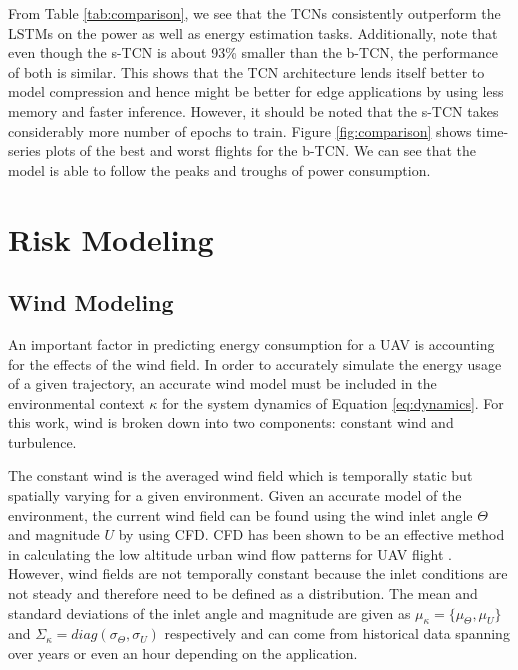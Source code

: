 \documentclass[letterpaper, 10 pt, conference]{ieeeconf}
\begin{document}
From Table \ref{tab:comparison}, we see that the TCNs consistently outperform the LSTMs on the power as well as energy estimation tasks. Additionally, note that even though the s-TCN is about 93\% smaller than the b-TCN, the performance of both is similar. This shows that the TCN architecture lends itself better to model compression and hence might be better for edge applications by using less memory and faster inference. However, it should be noted that the s-TCN takes considerably more number of epochs to train. Figure \ref{fig:comparison} shows time-series plots of the best and worst flights for the b-TCN. We can see that the model is able to follow the peaks and troughs of power consumption. 












\section{Risk Modeling}
\label{sec:risk_modeling}



\subsection{Wind Modeling}
\label{sec:wind}

An important factor in predicting energy consumption for a UAV is accounting for the effects of the wind field. In order to accurately simulate the energy usage of a given trajectory, an accurate wind model must be included in the environmental context $\kappa$ for the system dynamics of Equation \ref{eq:dynamics}. For this work, wind is broken down into two components: constant wind and turbulence. 



The constant wind is the averaged wind field which is temporally static but spatially varying for a given environment. Given an accurate model of the environment, the current wind field can be found using the wind inlet angle $\Theta$ and magnitude $U$ by using CFD. 
CFD has been shown to be an effective method in calculating the low altitude urban wind flow patterns for UAV flight \cite{orr2005framework, ware2016analysis, galway2011modeling, pat2020}. However, wind fields are not temporally constant because the inlet conditions are not steady and therefore need to be defined as a distribution. The mean and standard deviations of the inlet angle and magnitude are given as $\mu_{\kappa} = \{\mu_\Theta,\mu_U\}$ and $\Sigma_{\kappa} = diag(\sigma_\Theta,\sigma_U)$ respectively and can come from historical data spanning over years or even an hour depending on the application. 
\end{document}
